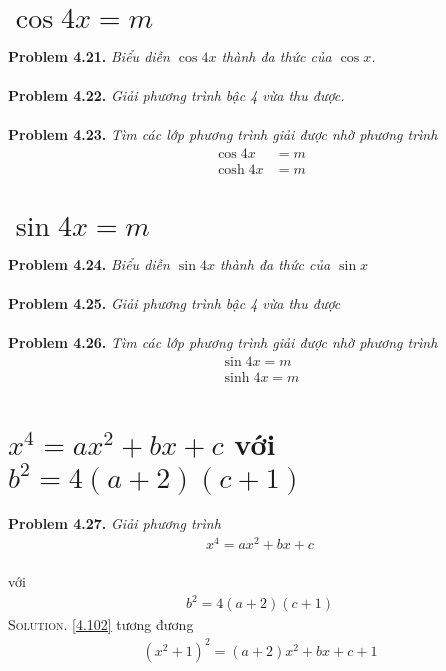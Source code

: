 \documentclass[a4paper,oneside]{book}
\numberwithin{equation}{chapter}
\begin{document}
\section{$\cos 4x = m$}
\textbf{Problem 4.21.} \textit{Biểu diễn $\cos 4x$ thành đa thức của $\cos x$.}\\
\\
\textbf{Problem 4.22.} \textit{Giải phương trình bậc 4 vừa thu được.}\\
\\
\textbf{Problem 4.23.} \textit{Tìm các lớp phương trình giải được nhờ phương trình}
\begin{align}
\cos 4x &= m\\
\cosh 4x &= m
\end{align}
\section{$\sin 4x = m$}
\textbf{Problem 4.24.} \textit{Biểu diễn $\sin 4x$ thành đa thức của $\sin x$}\\
\\
\textbf{Problem 4.25.} \textit{Giải phương trình bậc 4 vừa thu được}\\
\\
\textbf{Problem 4.26.} \textit{Tìm các lớp phương trình giải được nhờ phương trình}
\begin{align}
\sin 4x = m\\
\sinh 4x = m
\end{align}
\section{${x^4} = a{x^2} + bx + c$ với ${b^2} = 4\left( {a + 2} \right)\left( {c + 1} \right)$}
\textbf{Problem 4.27.} \textit{Giải phương trình}
\begin{align}
\label{4.102}
{x^4} = a{x^2} + bx + c
\end{align} \\
với
\begin{align}
{b^2} = 4\left( {a + 2} \right)\left( {c + 1} \right)
\end{align}
\textsc{Solution.} \eqref{4.102} tương đương
\begin{align}
\label{4.104}
{\left( {{x^2} + 1} \right)^2} = \left( {a + 2} \right){x^2} + bx + c + 1
\end{align}
\end{document}
